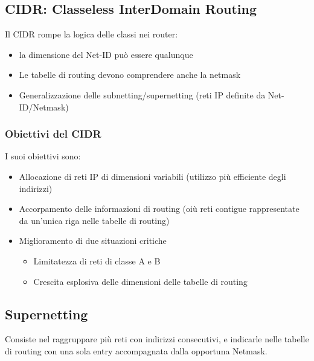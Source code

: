 \documentclass{report}
\begin{document}
            \subsection{CIDR: Classeless InterDomain Routing}
                Il CIDR rompe la logica delle classi nei router:
                \begin{itemize}
                    \item la dimensione del Net-ID può essere qualunque
                    \item Le tabelle di routing devono comprendere anche la netmask
                    \item Generalizzazione delle subnetting/supernetting (reti IP definite da Net-ID/Netmask)
                \end{itemize} 
                \subsubsection{Obiettivi del CIDR}
                    I suoi obiettivi sono:
                    \begin{itemize}
                        \item Allocazione di reti IP di dimensioni variabili (utilizzo più efficiente degli indirizzi)
                        \item Accorpamento delle informazioni di routing (oiù reti contigue rappresentate da un'unica riga nelle tabelle di routing)
                        \item Miglioramento di due situazioni critiche
                            \begin{itemize}
                                \item Limitatezza di reti di classe A e B
                                \item Crescita esplosiva delle dimensioni delle tabelle di routing
                            \end{itemize}
                    \end{itemize}
            \subsection{Supernetting}
                    Consiste nel raggruppare più reti con indirizzi consecutivi, e indicarle nelle tabelle di routing con una sola entry accompagnata dalla opportuna Netmask.
\end{document}
